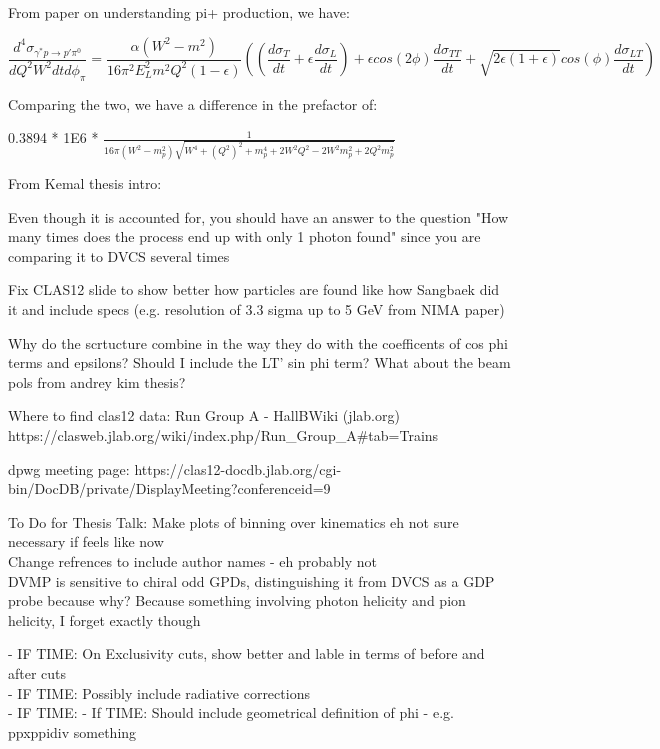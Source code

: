 

From paper on understanding pi+ production, we have:

 \begin{equation}\label{xsec}
     \frac{d^4\sigma_{\gamma^*p \rightarrow p'\pi^0}}{dQ^2W^2dtd\phi_{\pi}} =
     \frac{\alpha (W^2-m^2)}{16\pi^2 E^2_L m^2 Q^2 (1-\epsilon)}
     ((\frac{d\sigma_T}{dt}+\epsilon\frac{d\sigma_L}{dt})+
     \epsilon cos(2\phi) \frac{d\sigma_{TT}}{dt} + \sqrt{2\epsilon(1+\epsilon)}cos(\phi)\frac{d\sigma_{LT}}{dt})
\end{equation}

Comparing the two, we have a difference in the prefactor of:



0.3894 * 1E6 * $\frac{1}{16\pi(W^2-m_p^2)\sqrt{W^4 + (Q^2)^2+m_p^4+2W^2Q^2-2W^2m_p^2+2Q^2m_p^2}}$




From Kemal thesis intro:

Even though it is accounted for, you should have an answer to the question "How many times does the process end up with only 1 photon found" since you are comparing it to DVCS several times

Fix CLAS12 slide to show better how particles are found like how Sangbaek did it and include specs (e.g. resolution of 3.3 sigma up to 5 GeV from NIMA paper)

Why do the scrtucture combine in the way they do with the coefficents of cos phi terms and epsilons? Should I include the LT' sin phi term? What about the beam pols from andrey kim thesis?

Where to find clas12 data:
Run Group A - HallBWiki (jlab.org)
https://clasweb.jlab.org/wiki/index.php/Run_Group_A#tab=Trains

dpwg meeting page: https://clas12-docdb.jlab.org/cgi-bin/DocDB/private/DisplayMeeting?conferenceid=9



To Do for Thesis Talk:
Make plots of binning over kinematics eh not sure necessary if feels like now\\
Change refrences to include author names - eh probably not\\

 DVMP is sensitive to chiral odd GPDs, distinguishing it from DVCS as a GDP probe because why? Because something involving photon helicity and pion helicity, I forget exactly though
 
 - IF TIME: On Exclusivity cuts, show better and lable in terms of before and after cuts\\
- IF TIME: Possibly include radiative corrections\\
- IF TIME: 
- If TIME: Should include geometrical definition of phi - e.g. ppxppidiv something\\

